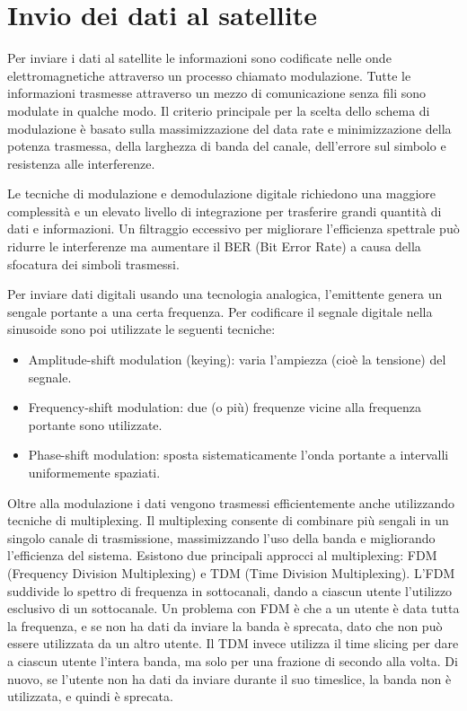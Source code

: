 
\chapter{Invio dei dati al satellite}

Per inviare i dati al satellite le informazioni sono codificate nelle onde elettromagnetiche attraverso un processo chiamato modulazione.
Tutte le informazioni trasmesse attraverso un mezzo di comunicazione senza fili sono modulate in qualche modo.
Il criterio principale per la scelta dello schema di modulazione è basato sulla massimizzazione del data rate e minimizzazione della potenza trasmessa, della larghezza di banda del canale, dell'errore sul simbolo e resistenza alle interferenze.

Le tecniche di modulazione e demodulazione digitale richiedono una maggiore complessità e un elevato livello di integrazione per trasferire grandi quantità di dati e informazioni.
Un filtraggio eccessivo per migliorare l'efficienza spettrale può ridurre le interferenze ma aumentare il \ac{BER} (Bit Error Rate) a causa della sfocatura dei simboli trasmessi.

Per inviare dati digitali usando una tecnologia analogica, l'emittente genera un sengale portante a una certa frequenza.
Per codificare il segnale digitale nella sinusoide sono poi utilizzate le seguenti tecniche:
\begin{itemize}
  \item Amplitude-shift modulation (keying): varia l'ampiezza (cioè la tensione) del segnale.
  \item Frequency-shift modulation: due (o più) frequenze vicine alla frequenza portante sono utilizzate.
  \item Phase-shift modulation: sposta sistematicamente l'onda portante a intervalli uniformemente spaziati.
\end{itemize}

Oltre alla modulazione i dati vengono trasmessi efficientemente anche utilizzando tecniche di multiplexing.
Il multiplexing consente di combinare più sengali in un singolo canale di trasmissione, massimizzando l'uso della banda e migliorando l'efficienza del sistema.
Esistono due principali approcci al multiplexing: FDM (Frequency Division Multiplexing) e TDM (Time Division Multiplexing).
L'FDM suddivide lo spettro di frequenza in sottocanali, dando a ciascun utente l'utilizzo esclusivo di un sottocanale.
Un problema con FDM è che a un utente è data tutta la frequenza, e se non ha dati da inviare la banda è sprecata, dato che non può essere utilizzata da un altro utente.
Il TDM invece utilizza il time slicing per dare a ciascun utente l'intera banda, ma solo per una frazione di secondo alla volta.
Di nuovo, se l'utente non ha dati da inviare durante il suo timeslice, la banda non è utilizzata, e quindi è sprecata.



